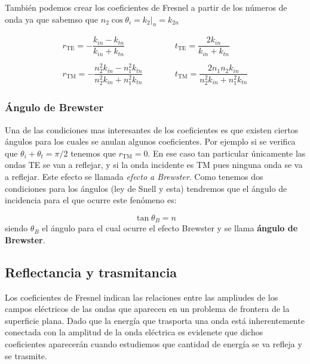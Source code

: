 \documentclass[12pt]{article}
\newcommand{\tquad}{\quad \quad \quad}
\numberwithin{equation}{section}
\numberwithin{figure}{section}
\begin{document}
También podemos crear los coeficientes de Fresnel a partir de los números de onda ya que sabemso que $n_2 \cos \theta_i = k_2 |_n = k_{2n}$

\begin{equation}
\begin{array}{ll}
r_{\mathrm{TE}} = - \dfrac{k_{in}-k_{tn}}{k_{in}+k_{tn}}
\tquad &
t_{\mathrm{TE}} =  \dfrac{2 k_{in}}{k_{in}+k_{tn}}
\\ \\
r_{\mathrm{TM}} = - \dfrac{n_2^2 k_{in}-n_1^2k_{tn}}{n_2^2 k_{in}+n_1^2k_{tn}}
\tquad &
t_{\mathrm{TM}} =  \dfrac{2 n_1 n_2 k_{in}}{ n_2^2 k_{in}+n_1^2k_{tn}}
\end{array} \label{Ec:6.3.3.23}
\end{equation}


\subsubsection{Ángulo de Brewster}

Una de las condiciones mas interesantes de los coeficientes es que existen ciertos ángulos para los cuales se anulan algunos coeficientes. Por ejemplo si se verifica que $\theta_i+\theta_t = \pi/2 $ tenemos que $r_{\mathrm{TM}}=0$. En ese caso tan particular únicamente las ondas TE se van a reflejar, y si la onda incidente es TM pues ninguna onda se va a reflejar. Este efecto se llamada \textit{efecto a Brewster}. Como tenemos dos condiciones para los ángulos (ley de Snell y esta) tendremos que el ángulo de incidencia para el que ocurre este fenómeno es:

\begin{equation}
\tan \theta_B = n 
\end{equation}
siendo $\theta_B$ el ángulo para el cual ocurre el efecto Brewster y se llama \textbf{ángulo de Brewster}.

\subsection{Reflectancia y trasmitancia}

Los coeficientes de Fresnel indican las relaciones entre las ampliudes de los campos eléctricos de las ondas que aparecen en un problema de frontera de la superficie plana. Dado que la energía que trasporta una onda está inherentemente conectada con la amplitud de la onda eléctrica es evidenete que dichos coeficientes aparecerán cuando estudiemos que cantidad de energía se va refleja y se trasmite. \\
\end{document}
